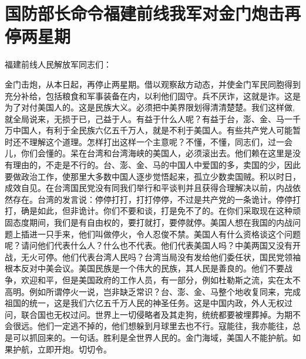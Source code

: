 \section[国防部长命令福建前线我军对金门炮击再停两星期（一九五八年十月十三日）]{国防部长命令福建前线我军对金门炮击再停两星期}


福建前线人民解放军同志们：

金门击炮，从本日起，再停止两星期。借以观察敌方动态，并使金门军民同胞得到充分补给，包括粮食和军事装备在内，以利他们固守。兵不厌诈，这就是诈。这是为了对付美国人的。这是民族大义。必须把中美界限划得清清楚楚。我们这样做,就全局说来，无损于已，己益于人。有益于什么人呢？有益于台，澎、金、马一千万中国人，有利于全民族六亿五千万人，就是不利于美国人。有些共产党人可能暂时还不理解这个道理。怎样打出这样一个主意呢？不懂，不懂，同志们，过一会儿，你们会懂的。呆在台湾和台湾海峡的美国人，必须滚出去。他们赖在这里是没有理由的，不走是不行的。台、澎、金、马的中国人中爱国的多，卖国的少，因此要做政治工作，使那里大多数中国人逐步觉悟起来，孤立少数卖国贼。积以时日，成效自见。在台湾国民党没有同我们举行和平谈判并且获得合理解决以前，内战依然存在。台湾的发言说：停停打打，打打停停，不过是共产党的一条诡计。停停打打，确是如此，但非诡计。你们不要和谈，打是免不了的。在你们采取现在这种顽固态度期间，我们是有自由权的，要打就打，要停就停。美国人想在我国的内战问题上插进一只手来，他们叫做停火，令人忍俊不禁。美国人有什么资格谈这个问题呢？请问他们代表什么人？什么也不代表。他们代表美国人吗？中美两国又没有开战，无火可停。他们代表台湾人民吗？台湾当局没有发给他们委任状，国民党领袖根本反对中美会议。美国民族是一个伟大的民族，其人民是善良的。他们不要战争，欢迎和平，但是美国政府的工作人员，有一部分，例如杜勒斯之流，实在太不高明。例如所谓停火一说，岂非缺乏常识？台、澎、金、马整个地收复同来，完成祖国的统一，这是我们六亿五千万人民的神圣任务。这是中国内政，外人无权过问，联合国也无权过问。世界上一切侵略者及其走狗，统统都要被埋葬掉。为期不会很远。他们一定逃不掉的，他们想躲到月球里去也不行。寇能往，我亦能往，总是可以抓回来的。一句话。胜利是全世界人民的。金门海域，美国人不能护航。如果护航，立即开炮。切切令。


